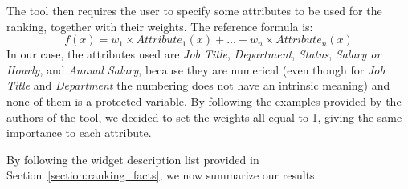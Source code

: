The tool then requires the user to specify some attributes to be used for the ranking, together with their weights. The reference formula is: \[f(x) = w_1 \times \mathit{Attribute}_1(x) + \ldots + w_n \times \mathit{Attribute}_n(x)\]
In our case, the attributes used are \textit{Job Title}, \textit{Department}, \textit{Status}, \textit{Salary or Hourly}, and \textit{Annual Salary}, because they are numerical (even though for \textit{Job Title} and \textit{Department} the numbering does not have an intrinsic meaning) and none of them is a protected variable. By following the examples provided by the authors of the tool, we decided to set the weights all equal to 1, giving the same importance to each attribute.

By following the widget description list provided in Section~\ref{section:ranking_facts}, we now summarize our results.
